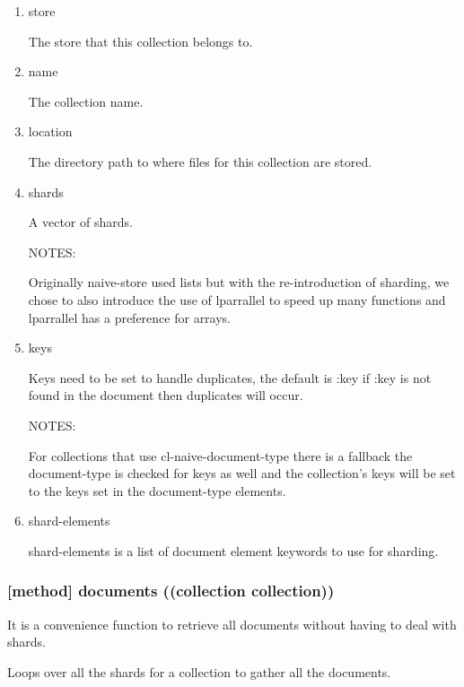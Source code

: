 \documentclass[11pt]{article}
\begin{document}
\begin{enumerate}
\item\relax [accessor] store
\label{sec:org580c102}

The store that this collection belongs to.

\item\relax [accessor] name
\label{sec:org7bc67b8}

The collection name.

\item\relax [accessor] location
\label{sec:org5c90d23}

The directory path to where files for this collection are stored.

\item\relax [accessor] shards
\label{sec:org0096f3c}

A vector of shards.

NOTES:

Originally naive-store used lists but with the re-introduction of
sharding, we chose to also introduce the use of lparrallel to speed
up many functions and lparrallel has a preference for arrays.

\item\relax [accessor] keys
\label{sec:org952d40d}

Keys need to be set to handle duplicates, the default is :key if :key
is not found in the document then duplicates will occur.

NOTES:

For collections that use cl-naive-document-type there is a fallback
the document-type is checked for keys as well and the collection's
keys will be set to the keys set in the document-type elements.

\item\relax [accessor] shard-elements
\label{sec:org032edcd}

shard-elements is a list of document element keywords to use for sharding.
\end{enumerate}

\subsubsection{[method] documents ((collection collection))}
\label{sec:orgd4082a0}

It is a convenience function to retrieve all documents without having
to deal with shards.

Loops over all the shards for a collection to gather all the
documents.
\end{document}
